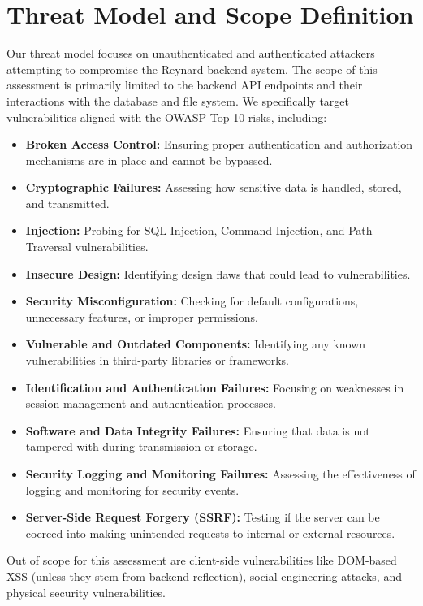 \documentclass{article}
\begin{document}
\section{Threat Model and Scope Definition}
Our threat model focuses on unauthenticated and authenticated attackers attempting to compromise the Reynard backend system. The scope of this assessment is primarily limited to the backend API endpoints and their interactions with the database and file system. We specifically target vulnerabilities aligned with the OWASP Top 10 risks, including:
\begin{itemize}
    \item \textbf{Broken Access Control:} Ensuring proper authentication and authorization mechanisms are in place and cannot be bypassed.
    \item \textbf{Cryptographic Failures:} Assessing how sensitive data is handled, stored, and transmitted.
    \item \textbf{Injection:} Probing for SQL Injection, Command Injection, and Path Traversal vulnerabilities.
    \item \textbf{Insecure Design:} Identifying design flaws that could lead to vulnerabilities.
    \item \textbf{Security Misconfiguration:} Checking for default configurations, unnecessary features, or improper permissions.
    \item \textbf{Vulnerable and Outdated Components:} Identifying any known vulnerabilities in third-party libraries or frameworks.
    \item \textbf{Identification and Authentication Failures:} Focusing on weaknesses in session management and authentication processes.
    \item \textbf{Software and Data Integrity Failures:} Ensuring that data is not tampered with during transmission or storage.
    \item \textbf{Security Logging and Monitoring Failures:} Assessing the effectiveness of logging and monitoring for security events.
    \item \textbf{Server-Side Request Forgery (SSRF):} Testing if the server can be coerced into making unintended requests to internal or external resources.
\end{itemize}
Out of scope for this assessment are client-side vulnerabilities like DOM-based XSS (unless they stem from backend reflection), social engineering attacks, and physical security vulnerabilities.
\end{document}
